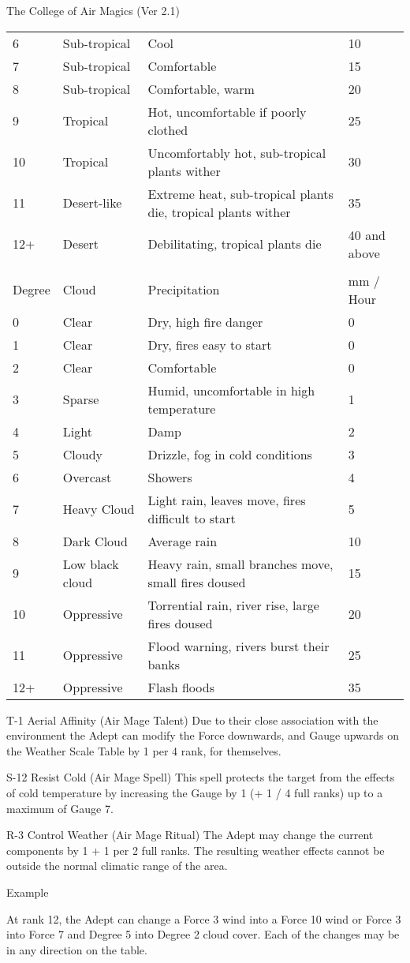 \begin{Chapter}{The College of Air Magics (Ver 2.1)}
\begin{table*}
\begin{tabularx}{\linewidth}{llXl}
6 		& Sub-tropical 		& Cool									& 10 \\
7 		& Sub-tropical 		& Comfortable								& 15 \\
8 		& Sub-tropical 		& Comfortable, warm							& 20 \\
9 		& Tropical 		& Hot, uncomfortable if poorly clothed					& 25 \\
10 		& Tropical 		& Uncomfortably hot, sub-tropical plants wither				& 30 \\
11 		& Desert-like 		& Extreme heat, sub-tropical plants die, tropical plants wither		& 35 \\
12+ 		& Desert 		& Debilitating, tropical plants die					& 40 and above \\
\\
Degree 		& Cloud 		& Precipitation								& mm / Hour \\
0 		& Clear 		& Dry, high fire danger							& 0 \\
1 		& Clear 		& Dry, fires easy to start						& 0 \\
2 		& Clear 		& Comfortable								& 0 \\
3 		& Sparse 		& Humid, uncomfortable in high temperature				& 1 \\
4 		& Light 		& Damp									& 2 \\
5 		& Cloudy 		& Drizzle, fog in cold conditions					& 3 \\
6 		& Overcast 		& Showers								& 4 \\
7 		& Heavy Cloud 		& Light rain, leaves move, fires difficult to start			& 5 \\
8 		& Dark Cloud 		& Average rain								& 10 \\
9 		& Low black cloud 	& Heavy rain, small branches move, small fires doused			& 15 \\
10 		& Oppressive 		& Torrential rain, river rise, large fires doused			& 20 \\
11 		& Oppressive 		& Flood warning, rivers burst their banks				& 25 \\
12+		& Oppressive		& Flash floods								& 35 \\
\end{tabularx}
T-1 Aerial Affinity (Air Mage Talent) Due to their close association with the environment the Adept can modify the Force downwards, and Gauge upwards on the Weather Scale Table by 1 per 4 rank, for themselves. 

S-12 Resist Cold (Air Mage Spell) This spell protects the target from the effects of cold temperature by increasing the Gauge by 1 (+ 1 / 4 full ranks) up to a maximum of Gauge 7. 

R-3 Control Weather (Air Mage Ritual) The Adept may change the current components by 1 + 1 per 2 full ranks. The resulting weather effects cannot be outside 
the normal climatic range of the area. 

Example 

At rank 12, the Adept can change a Force 3 wind into a Force 10 wind or Force 3 into Force 7 and Degree 5 into Degree 2 cloud cover. Each of the changes may be in any direction on the table. 
\end{table*}
\end{Chapter}
